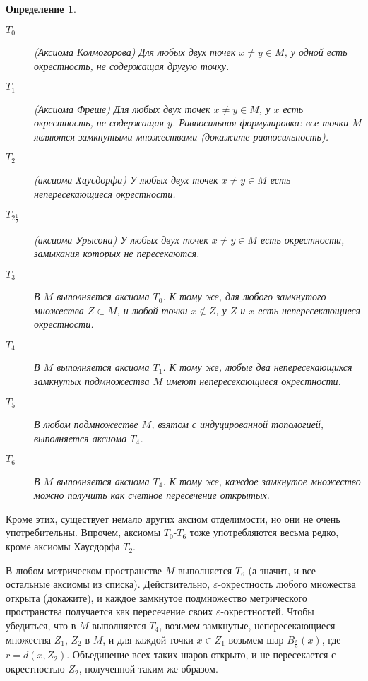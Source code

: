 \documentclass[12pt]{book}
\renewcommand{\epsilon}{\varepsilon}
\theoremstyle{upshape}
\theoremstyle{generic}
\newtheorem{opredelenie}[teorema]{Определение}
\def\еза{\end{remark}}
\theoremstyle{upshapenonumber}
\newcommand{\следствие}{%
     \refstepcounter{teorema}
     {\noindent\bf Следствие \thechapter.\arabic{teorema}:\ }}
\newcommand{\пример}{%
     \refstepcounter{teorema}
     {\noindent\bf Пример \thechapter.\arabic{teorema}:\ }}
\newcommand{\лемма}{%
     \refstepcounter{teorema}
     {\noindent\bf Лемма \thechapter.\arabic{teorema}:\ }}
\newcommand{\теорема}{%
     \refstepcounter{teorema}
     {\noindent\bf Теорема \thechapter.\arabic{teorema}:\ }}
\newcommand{\утверждение}{%
     \refstepcounter{teorema}
     {\noindent\bf Утверждение \thechapter.\arabic{teorema}:\ }}
\def\ем{\em}
\def\ез{\end{zadacha}}
\def\еу{\end{ukazanie}}
\def\определение{\begin{opredelenie}}
\def\ео{\end{opredelenie}}
\def\енум{\begin{enumerate}}
\def\ее{\end{enumerate}}
\begin{document}
\определение\ \\
\begin{description}
\item[$T_0$] (Аксиома Колмогорова) Для любых двух точек $x\neq y \in M$, 
у одной есть окрестность, не содержащая другую точку.

\item[$T_1$] (Аксиома Фреше)
Для любых двух точек $x\neq y \in M$, 
у $x$ есть окрестность, не содержащая $y$.
Равносильная формулировка: все точки $M$ являются
замкнутыми множествами (докажите равносильность).

\item[$T_2$] (аксиома Хаусдорфа)
У любых двух точек $x\neq y \in M$
есть непересекающиеся окрестности.

\item[$T_{2\frac 1 2}$] (аксиома Урысона)
У любых двух точек $x\neq y \in M$
есть окрестности, замыкания которых не пересекаются.

\item[$T_3$] В $M$ выполняется аксиома $T_0$.
К тому же, для любого замкнутого множества
$Z\subset M$, и любой точки $x\notin Z$,
у $Z$ и $x$ есть непересекающиеся окрестности.

\item[$T_4$] В $M$ выполняется аксиома $T_1$.
К тому же, любые два непересекающихся замкнутых
подмножества $M$ имеют непересекающиеся окрестности.

\item[$T_5$] В любом подмножестве $M$, взятом с 
индуцированной топологией, выполняется
аксиома $T_4$.

\item[$T_6$] В $M$ выполняется аксиома $T_4$.
К тому же, каждое замкнутое множество можно
получить как счетное пересечение открытых.
\end{description}
\ео

Кроме этих, существует немало других аксиом отделимости,
но они не очень употребительны. Впрочем, аксиомы
$T_0$-$T_6$ тоже употребляются весьма редко, кроме 
аксиомы Хаусдорфа $T_2$.


В любом метрическом пространстве $M$ выполняется
$T_6$ (а значит, и все остальные аксиомы из списка).
Действительно, $\epsilon$-окрестность любого множества
открыта (докажите), и каждое замкнутое подмножество 
метрического пространства получается
как пересечение своих $\epsilon$-окрестностей.
Чтобы убедиться, что в $M$ выполняется $T_4$,
возьмем замкнутые, непересекающиеся множества
$Z_1$, $Z_2$ в $M$, и для каждой точки
$x\in Z_1$ возьмем шар $B_{\frac r 3}(x)$,
где $r= d(x, Z_2)$. Объединение всех таких
шаров открыто, и не пересекается с окрестностью 
$Z_2$, полученной таким же образом.
\end{document}
